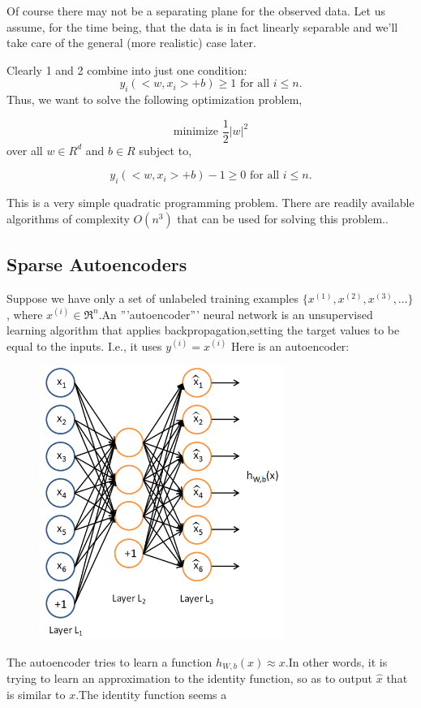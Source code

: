 \documentclass[10pt,twocolumn,letterpaper]{article}
\begin{document}
Of course there may not be a separating plane for the observed
data. Let us assume, for the time being, that the data is in fact
linearly separable and we'll take care of the general (more realistic)
case later.  


Clearly 1 and 2 combine into just one condition:
\[ y_{i}( <w,x_{i}> + b ) \ge 1 \mbox{\ for all $i\le n$}. \]
Thus, we want to solve the following optimization problem,

\[ \mbox{minimize\ } \frac{1}{2}|w|^{2} \]
over all $w\in R^{d}$ and $b\in R$ subject to,

\[ y_{i}( <w,x_{i}> + b ) -1 \ge 0 \mbox{\ for all $i\le n$}. \]

This is a very simple quadratic programming problem. There are readily
available algorithms of complexity $O(n^{3})$ that can be used for
solving this problem..
\subsection{Sparse Autoencoders}
Suppose we have only a set of unlabeled training examples $\textstyle \{x^{(1)}, x^{(2)}, x^{(3)}, \ldots\}$,
where $\textstyle x^{(i)} \in \Re^{n}$.An '''autoencoder''' neural network is an unsupervised learning algorithm that applies backpropagation,setting the target values to be equal to the inputs.  I.e., it uses $\textstyle y^{(i)} = x^{(i)}$
Here is an autoencoder:
\begin{figure}[ht!]
\includegraphics[width=8cm]{2.png}
\end{figure}
The autoencoder tries to learn a function $\textstyle h_{W,b}(x) \approx x$.In other
words, it is trying to learn an approximation to the identity function, so as
to output $\textstyle \hat{x}$ that is similar to $\textstyle x$.The identity function seems a
\end{document}
